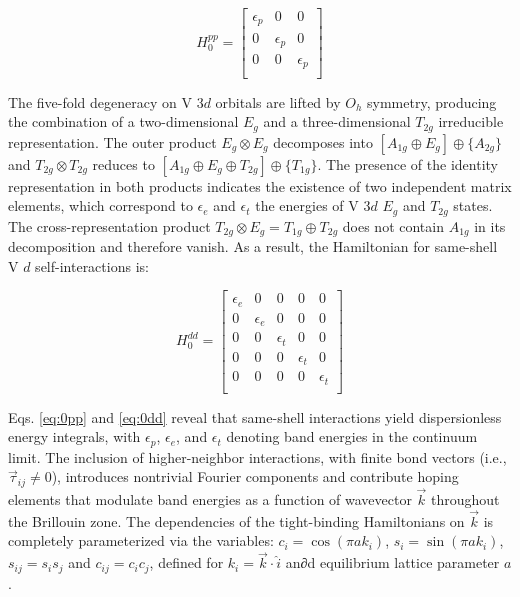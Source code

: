 \documentclass[twocolumn,showpacs,preprintnumbers,superscriptaddress,prb,floatfix,aps,10pt]{revtex4-1}
\begin{document}
\begin{equation}
\label{eq:0pp}
H_0^{pp} =
\begin{bmatrix}
\epsilon_{p} & 0 & 0 \\
0 & \epsilon_{p} & 0 \\
0 & 0 & \epsilon_{p} \\
\end{bmatrix}
\end{equation}

The five-fold degeneracy on V 3$d$ orbitals are lifted by $O_h$ symmetry, producing the combination of a two-dimensional $E_g$ and a three-dimensional $T_{2g}$ irreducible representation. The outer product $E_g \otimes E_g$ decomposes into $[A_{1g} \oplus E_g] \oplus \{A_{2g}\}$ and $T_{2g} \otimes T_{2g}$ reduces to $[A_{1g} \oplus E_{g} \oplus T_{2g}] \oplus \{T_{1g}\}$. The presence of the identity representation in both products indicates the existence of two independent matrix elements, which correspond to $\epsilon_e$ and $\epsilon_t$ the energies of V 3$d$ $E_g$ and $T_{2g}$ states. The cross-representation product $T_{2g} \otimes E_g = T_{1g} \oplus T_{2g}$ does not contain $A_{1g}$ in its decomposition and therefore vanish. As a result, the Hamiltonian for same-shell V $d$ self-interactions is:


\begin{equation}
\label{eq:0dd}
H_0^{dd} =
\begin{bmatrix}
 \epsilon_{e} & 0 & 0 & 0 & 0 \\
 0 & \epsilon_{e} & 0 & 0 & 0 \\
 0 & 0 & \epsilon_{t} & 0 & 0 \\
 0 & 0 & 0 & \epsilon_{t} & 0 \\
 0 & 0 & 0 & 0 & \epsilon_{t} \\
\end{bmatrix}
\end{equation}

Eqs. \ref{eq:0pp} and \ref{eq:0dd} reveal that same-shell interactions yield dispersionless energy integrals, with $\epsilon_p$, $\epsilon_e$, and $\epsilon_t$ denoting band energies in the continuum limit. The inclusion of higher-neighbor interactions, with finite bond vectors (i.e., $\vec{\tau}_{ij} \neq 0$), introduces nontrivial Fourier components and contribute hoping elements that modulate band energies as a function of wavevector $\vec{k}$ throughout the Brillouin zone. The dependencies of the tight-binding Hamiltonians on $\vec{k}$ is completely parameterized via the variables: $c_i = \cos(\pi a k_i)$, $s_i = \sin(\pi a k_i)$, $s_{ij} = s_i s_j$ and $c_{ij} = c_i c_j$, defined for $k_i = \vec{k}\cdot\hat{i}$ an∂d equilibrium lattice parameter $a$.
\end{document}
